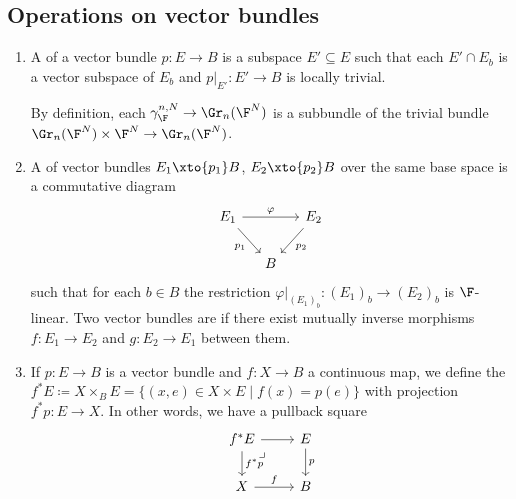 \subsection{Operations on vector bundles}
\begin{definition}
	\leavevmode
	\begin{enumerate}
		\item A  of a vector bundle $p\colon E \to B$ is a subspace $E' \subseteq E$ such that each $E' \cap E_b$ is a vector subspace of $E_b$ and $p|_{E'}\colon E' \to B$ is locally trivial.
			\begin{example}
				By definition, each $\gamma_{\F}^{n, N} \to \Gr_n(\F^N)$ is a subbundle of the trivial bundle $\Gr_n(\F^N) \times \F^N \to \Gr_n(\F^N)$.
			\end{example}
		\item A  of vector bundles $E_1 \xto{p_1} B$, $E_2 \xto{p_2} B$ over the same base space is a commutative diagram
			\begin{equation*}
				\begin{tikzcd}[column sep = small]
					E_1 
							\ar[rr, "\varphi"]
							\ar[dr, swap, "p_1"]
						& & E_2
							\ar[dl, "p_2"]
					\\
						& B
				\end{tikzcd}
			\end{equation*}
			such that for each $b \in B$ the restriction $\varphi|_{(E_1)_b}\colon (E_1)_b \to (E_2)_b$ is $\F$-linear.
			Two vector bundles are  if there exist mutually inverse morphisms $f\colon E_1 \to E_2$ and $g\colon E_2 \to E_1$ between them.
		\item If $p\colon E \to B$ is a vector bundle and $f\colon X \to B$ a continuous map, we define the  $f^* E \coloneq X \times_B E = \{(x, e) \in X \times E \mid f(x) = p(e)\}$ with projection $f^* p\colon E \to X$.
			In other words, we have a pullback square
			\begin{equation*}
				\begin{tikzcd}
					f^* E
							\ar[r]
							\ar[d, "f^* p"]
							\ar[dr, phantom, "\lrcorner" very near start]
						& E
							\ar[d, "p"]
					\\
					X
							\ar[r, "f"]
						& B
				\end{tikzcd}

\end{equation*}
\end{enumerate}
\end{definition}

